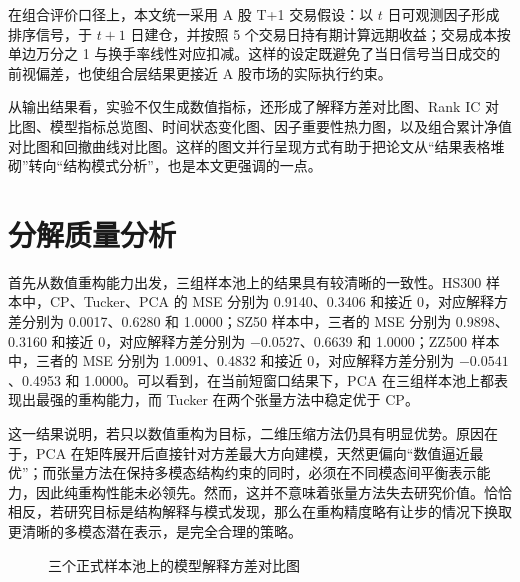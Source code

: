 在组合评价口径上，本文统一采用 A 股 T+1 交易假设：以 $t$ 日可观测因子形成排序信号，于 $t+1$ 日建仓，并按照 5 个交易日持有期计算远期收益；交易成本按单边万分之 1 与换手率线性对应扣减。这样的设定既避免了当日信号当日成交的前视偏差，也使组合层结果更接近 A 股市场的实际执行约束。

从输出结果看，实验不仅生成数值指标，还形成了解释方差对比图、Rank IC 对比图、模型指标总览图、时间状态变化图、因子重要性热力图，以及组合累计净值对比图和回撤曲线对比图。这样的图文并行呈现方式有助于把论文从“结果表格堆砌”转向“结构模式分析”，也是本文更强调的一点。

\section{分解质量分析}

首先从数值重构能力出发，三组样本池上的结果具有较清晰的一致性。HS300 样本中，CP、Tucker、PCA 的 MSE 分别为 0.9140、0.3406 和接近 0，对应解释方差分别为 0.0017、0.6280 和 1.0000；SZ50 样本中，三者的 MSE 分别为 0.9898、0.3160 和接近 0，对应解释方差分别为 $-0.0527$、0.6639 和 1.0000；ZZ500 样本中，三者的 MSE 分别为 1.0091、0.4832 和接近 0，对应解释方差分别为 $-0.0541$、0.4953 和 1.0000。可以看到，在当前短窗口结果下，PCA 在三组样本池上都表现出最强的重构能力，而 Tucker 在两个张量方法中稳定优于 CP。

这一结果说明，若只以数值重构为目标，二维压缩方法仍具有明显优势。原因在于，PCA 在矩阵展开后直接针对方差最大方向建模，天然更偏向“数值逼近最优”；而张量方法在保持多模态结构约束的同时，必须在不同模态间平衡表示能力，因此纯重构性能未必领先。然而，这并不意味着张量方法失去研究价值。恰恰相反，若研究目标是结构解释与模式发现，那么在重构精度略有让步的情况下换取更清晰的多模态潜在表示，是完全合理的策略。

\begin{figure}[!t]
\centering
{}
\caption{三个正式样本池上的模型解释方差对比图}
\label{fig:variance}
\end{figure}

